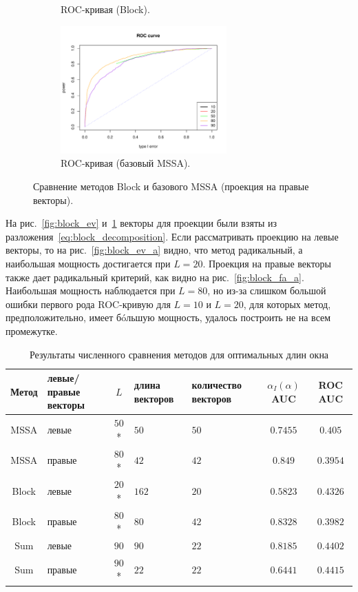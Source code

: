 \documentclass[specialist,
substylefile = spbu_report.rtx,
subf,href,colorlinks=true, 12pt]{disser}
\theoremstyle{definition}
\begin{document}
\begin{figure}[h!]
\begin{subfigure}[t]{0.45\textwidth}
		\caption{ROC-кривая (Block).}
	\end{subfigure}\hspace{\fill}
	\begin{subfigure}[t]{0.45\textwidth}
		\centering
		\includegraphics[width=0.7\textwidth]{img/roc_mssa_fa.pdf}
		\caption{ROC-кривая (базовый MSSA).}
	\end{subfigure}
	\caption{Сравнение методов Block и базового MSSA (проекция на правые векторы).}
	\label{fig:block_fa}
\end{figure}

На рис.~\ref{fig:block_ev} и~\ref{fig:block_fa} векторы для проекции были взяты из разложения~\eqref{eq:block_decomposition}. Если рассматривать проекцию на левые векторы, то на рис.~\ref{fig:block_ev_a} видно, что метод радикальный, а наибольшая мощность достигается при $L=20$. Проекция на правые векторы также дает радикальный критерий, как видно на рис.~\ref{fig:block_fa_a}. Наибольшая мощность наблюдается при $L=80$, но из-за слишком большой ошибки первого рода ROC-кривую для $L=10$ и $L=20$, для которых метод, предположительно, имеет б\'oльшую мощность, удалось построить не на всем промежутке.

\begin{table}[h]
	\caption{Результаты численного сравнения методов для оптимальных длин окна}
	\label{tab:res_mc-ssa}
	\centering
	\begin{tabular}{|c>{\centering\arraybackslash}m{1in}c>{\centering\arraybackslash}m{1in} >{\centering\arraybackslash}m{1in}cc|}\hline
		Метод & левые/правые векторы & $L$ & длина векторов & количество векторов & $\alpha_I(\alpha)$ AUC & ROC AUC \\
		\hline
		MSSA & левые & $50$* & $50$ & $50$ & $0.7455$ & $0.405$\\
		\hline
		MSSA & правые & $80$* & $42$ & $42$ & $0.849$ & $0.3954$\\
		\hline
		Block & левые & $20$* & $162$ & $20$ & $0.5823$ & $0.4326$ \\
		\hline
		Block & правые & $80$* & $80$ & $42$ & $0.8328$ & $0.3982$\\
		\hline
		Sum & левые & $90$ & $90$ & $22$ & $0.8185$ & $0.4402$ \\
		\hline
		Sum & правые & $90$* & $22$ & $22$ & $0.6441$ & $0.4415$ \\
		\hline
	\end{tabular}

\end{table}
\end{document}
